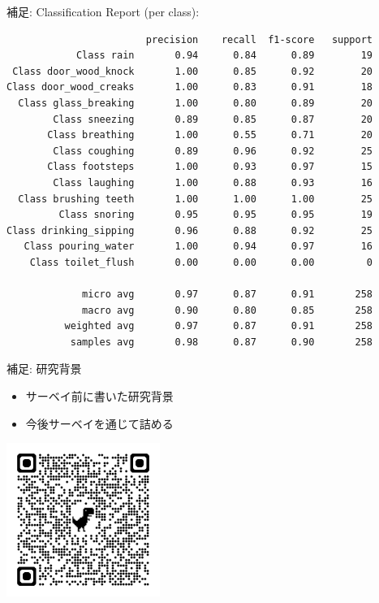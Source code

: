 \documentclass[unicode,12pt,aspectratio=169,dvipdfmx]{beamer}
\begin{document}
\begin{frame}[fragile]{補足: Classification Report (per class):}
\begin{verbatim}
                        precision    recall  f1-score   support
            Class rain       0.94      0.84      0.89        19
 Class door_wood_knock       1.00      0.85      0.92        20
Class door_wood_creaks       1.00      0.83      0.91        18
  Class glass_breaking       1.00      0.80      0.89        20
        Class sneezing       0.89      0.85      0.87        20
       Class breathing       1.00      0.55      0.71        20
        Class coughing       0.89      0.96      0.92        25
       Class footsteps       1.00      0.93      0.97        15
        Class laughing       1.00      0.88      0.93        16
  Class brushing teeth       1.00      1.00      1.00        25
         Class snoring       0.95      0.95      0.95        19
Class drinking_sipping       0.96      0.88      0.92        25
   Class pouring_water       1.00      0.94      0.97        16
    Class toilet_flush       0.00      0.00      0.00         0

             micro avg       0.97      0.87      0.91       258
             macro avg       0.90      0.80      0.85       258
          weighted avg       0.97      0.87      0.91       258
           samples avg       0.98      0.87      0.90       258
\end{verbatim}
\end{frame}


\begin{frame}{補足: 研究背景}
    \begin{itemize}
    \item サーベイ前に書いた研究背景
    \item 今後サーベイを通じて詰める
    \end{itemize}
 \includegraphics[width=5cm]{figures/qrcode_scrapbox.io.png}
\end{frame}
\end{document}
